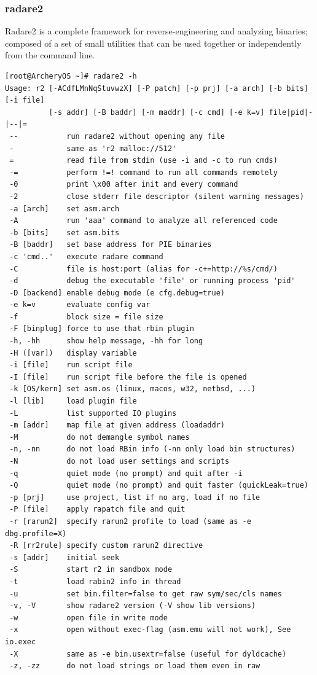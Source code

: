 \documentclass{article}
\begin{document}
\subsubsection{radare2}
Radare2 is a complete framework for reverse-engineering and analyzing binaries; composed of a set of small utilities that can be used together or independently from the command line.
\begin{lstlisting}
[root@ArcheryOS ~]# radare2 -h
Usage: r2 [-ACdfLMnNqStuvwzX] [-P patch] [-p prj] [-a arch] [-b bits] [-i file]
          [-s addr] [-B baddr] [-m maddr] [-c cmd] [-e k=v] file|pid|-|--|=
 --           run radare2 without opening any file
 -            same as 'r2 malloc://512'
 =            read file from stdin (use -i and -c to run cmds)
 -=           perform !=! command to run all commands remotely
 -0           print \x00 after init and every command
 -2           close stderr file descriptor (silent warning messages)
 -a [arch]    set asm.arch
 -A           run 'aaa' command to analyze all referenced code
 -b [bits]    set asm.bits
 -B [baddr]   set base address for PIE binaries
 -c 'cmd..'   execute radare command
 -C           file is host:port (alias for -c+=http://%s/cmd/)
 -d           debug the executable 'file' or running process 'pid'
 -D [backend] enable debug mode (e cfg.debug=true)
 -e k=v       evaluate config var
 -f           block size = file size
 -F [binplug] force to use that rbin plugin
 -h, -hh      show help message, -hh for long
 -H ([var])   display variable
 -i [file]    run script file
 -I [file]    run script file before the file is opened
 -k [OS/kern] set asm.os (linux, macos, w32, netbsd, ...)
 -l [lib]     load plugin file
 -L           list supported IO plugins
 -m [addr]    map file at given address (loadaddr)
 -M           do not demangle symbol names
 -n, -nn      do not load RBin info (-nn only load bin structures)
 -N           do not load user settings and scripts
 -q           quiet mode (no prompt) and quit after -i
 -Q           quiet mode (no prompt) and quit faster (quickLeak=true)
 -p [prj]     use project, list if no arg, load if no file
 -P [file]    apply rapatch file and quit
 -r [rarun2]  specify rarun2 profile to load (same as -e dbg.profile=X)
 -R [rr2rule] specify custom rarun2 directive
 -s [addr]    initial seek
 -S           start r2 in sandbox mode
 -t           load rabin2 info in thread
 -u           set bin.filter=false to get raw sym/sec/cls names
 -v, -V       show radare2 version (-V show lib versions)
 -w           open file in write mode
 -x           open without exec-flag (asm.emu will not work), See io.exec
 -X           same as -e bin.usextr=false (useful for dyldcache)
 -z, -zz      do not load strings or load them even in raw
\end{lstlisting}
\end{document}
